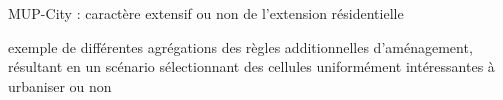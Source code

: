 \documentclass[xcolor=table]{beamer}
\begin{document}

\begin{frame}{MUP-City : caractère extensif ou non de l'extension résidentielle}
\vspace{1cm}

{\footnotesize exemple de différentes agrégations des règles additionnelles d'aménagement, résultant en un scénario sélectionnant des cellules uniformément intéressantes à urbaniser ou non}
\end{frame}
\end{document}
